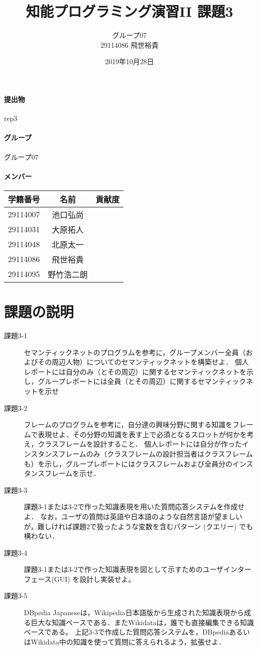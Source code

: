 \documentclass[a4j]{jarticle}
\title{知能プログラミング演習II 課題3}
\author{グループ07\\
  29114086 飛世裕貴\\
}
\date{2019年10月28日}
\begin{document}
\maketitle

\paragraph{提出物} rep3
\paragraph{グループ} グループ07
\paragraph{メンバー}
\begin{tabular}{|c|c|c|}
  \hline\hline
  学籍番号&名前&貢献度\\
  \hline\hline
  29114007&池口弘尚&\\
  \hline
  29114031&大原拓人&\\
  \hline
  29114048&北原太一&\\
  \hline
  29114086&飛世裕貴&\\
  \hline
  29114095&野竹浩二朗&\\
  \hline
\end{tabular}



\section{課題の説明}
\begin{description}
\item[課題3-1] セマンティックネットのプログラムを参考に，グループメンバー全員（およびその周辺人物）についてのセマンティックネットを構築せよ．
個人レポートには自分のみ（とその周辺）に関するセマンティックネットを示し，グループレポートには全員（とその周辺）に関するセマンティックネットを示せ

\item[課題3-2] フレームのプログラムを参考に，自分達の興味分野に関する知識をフレームで表現せよ．その分野の知識を表す上で必須となるスロットが何かを考え，クラスフレームを設計すること．
個人レポートには自分が作ったインスタンスフレームのみ（クラスフレームの設計担当者はクラスフレームも）を示し，グループレポートにはクラスフレームおよび全員分のインスタンスフレームを示せ．
\item[課題3-3] 課題3-1または3-2で作った知識表現を用いた質問応答システムを作成せよ．
なお，ユーザの質問は英語や日本語のような自然言語が望ましいが，難しければ課題2で扱ったような変数を含むパターン (クエリー) でも構わない．

\item[課題3-4]課題3-1または3-2で作った知識表現を図として示すためのユーザインターフェース(GUI) を設計し実装せよ。
\item[課題3-5] DBpedia Japaneseは，Wikipedia日本語版から生成された知識表現から成る巨大な知識ベースである．またWikidataは，誰でも直接編集できる知識ベースである。
上記3-3で作成した質問応答システムを，DBpediaあるいはWikidata中の知識を使って質問に答えられるよう，拡張せよ．

\end{description}
\end{document}
